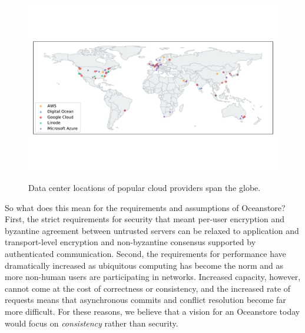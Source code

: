 \begin{figure}
    \begin{center}
        \includegraphics[width=5in]{figures/ch01_cloud_data_centers.pdf}
    \end{center}
    \renewcommand{\baselinestretch}{1}
    \small\normalsize

    \begin{quote}
        \caption[Global Data Centers of Cloud Providers]{Data center locations of popular cloud providers span the globe.}
        \label{fig:ch01_cloud_data_centers}
    \end{quote}
\end{figure}
\renewcommand{\baselinestretch}{2}
\small\normalsize

So what does this mean for the requirements and assumptions of Oceanstore?
First, the strict requirements for security that meant per-user encryption and byzantine agreement between untrusted servers can be relaxed to application and transport-level encryption and non-byzantine consensus supported by authenticated communication.
Second, the requirements for performance have dramatically increased as ubiquitous computing has become the norm and as more non-human users are participating in networks.
Increased capacity, however, cannot come at the cost of correctness or consistency, and the increased rate of requests means that asynchronous commits and conflict resolution become far more difficult.
For these reasons, we believe that a vision for an Oceanstore today would focus on \emph{consistency} rather than security.

